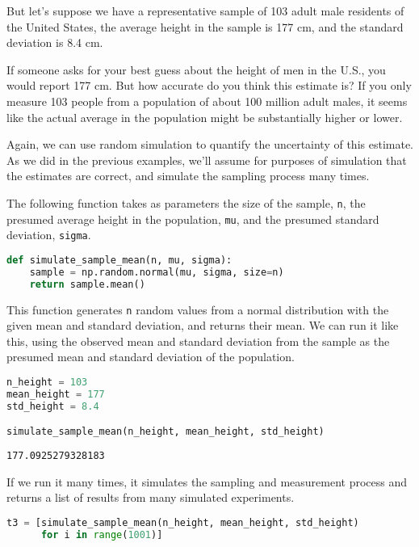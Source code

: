 But let's suppose we have a representative sample of 103 adult male
residents of the United States, the average height in the sample is 177
cm, and the standard deviation is 8.4 cm.

If someone asks for your best guess about the height of men in the U.S.,
you would report 177 cm. But how accurate do you think this estimate is?
If you only measure 103 people from a population of about 100 million
adult males, it seems like the actual average in the population might be
substantially higher or lower.

Again, we can use random simulation to quantify the uncertainty of this
estimate. As we did in the previous examples, we'll assume for purposes
of simulation that the estimates are correct, and simulate the sampling
process many times.

The following function takes as parameters the size of the sample,
\passthrough{\lstinline!n!}, the presumed average height in the
population, \passthrough{\lstinline!mu!}, and the presumed standard
deviation, \passthrough{\lstinline!sigma!}.

\begin{lstlisting}[language=Python,style=source]
def simulate_sample_mean(n, mu, sigma):
    sample = np.random.normal(mu, sigma, size=n)
    return sample.mean()
\end{lstlisting}

This function generates \passthrough{\lstinline!n!} random values from a
normal distribution with the given mean and standard deviation, and
returns their mean. We can run it like this, using the observed mean and
standard deviation from the sample as the presumed mean and standard
deviation of the population.

\begin{lstlisting}[language=Python,style=source]
n_height = 103
mean_height = 177
std_height = 8.4

simulate_sample_mean(n_height, mean_height, std_height)
\end{lstlisting}

\begin{lstlisting}[style=output]
177.0925279328183
\end{lstlisting}

If we run it many times, it simulates the sampling and measurement
process and returns a list of results from many simulated experiments.

\begin{lstlisting}[language=Python,style=source]
t3 = [simulate_sample_mean(n_height, mean_height, std_height)
      for i in range(1001)]
\end{lstlisting}

